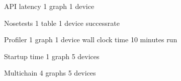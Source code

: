 
API latency
1 graph
1 device


Nosetests
1 table
1 device
successrate


Profiler
1 graph
1 device
wall clock time
10 minutes run


Startup time
1 graph
5 devices


Multichain
4 graphs
5 devices

